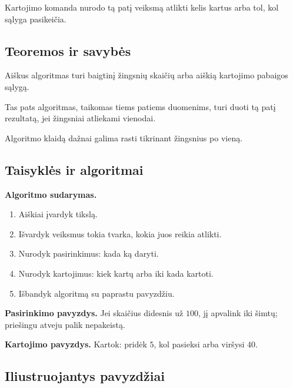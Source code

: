 \begin{apibreztis}
Kartojimo komanda nurodo tą patį veiksmą atlikti kelis kartus arba tol, kol sąlyga pasikeičia.
\end{apibreztis}

\subsection{Teoremos ir savybės}

\begin{savybe}
Aiškus algoritmas turi baigtinį žingsnių skaičių arba aiškią kartojimo pabaigos sąlygą.
\end{savybe}

\begin{savybe}
Tas pats algoritmas, taikomas tiems patiems duomenims, turi duoti tą patį rezultatą, jei žingsniai atliekami vienodai.
\end{savybe}

\begin{savybe}
Algoritmo klaidą dažnai galima rasti tikrinant žingsnius po vieną.
\end{savybe}

\subsection{Taisyklės ir algoritmai}

\textbf{Algoritmo sudarymas.}
\begin{enumerate}[label=\arabic*.]
\item Aiškiai įvardyk tikslą.
\item Išvardyk veiksmus tokia tvarka, kokia juos reikia atlikti.
\item Nurodyk pasirinkimus: kada ką daryti.
\item Nurodyk kartojimus: kiek kartų arba iki kada kartoti.
\item Išbandyk algoritmą su paprastu pavyzdžiu.
\end{enumerate}

\textbf{Pasirinkimo pavyzdys.}
Jei skaičius didesnis už \(100\), jį apvalink iki šimtų; priešingu atveju palik nepakeistą.

\textbf{Kartojimo pavyzdys.}
Kartok: pridėk \(5\), kol pasieksi arba viršysi \(40\).

\subsection{Iliustruojantys pavyzdžiai}

